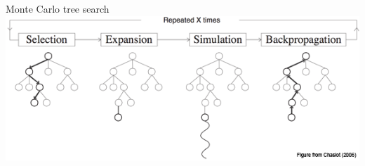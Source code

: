 \documentclass{beamer}
\begin{document}
  \begin{frame}{Monte Carlo tree search}
    \includegraphics[width=\textwidth]{../img/MCTS.png}
  \end{frame}

\end{document}
